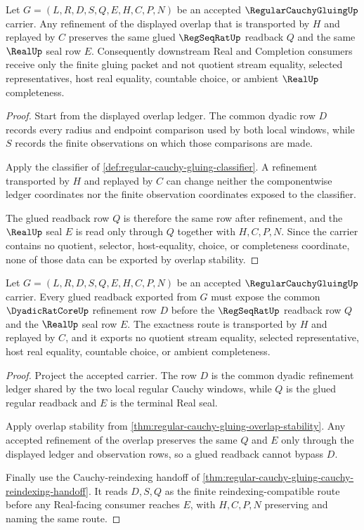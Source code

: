 \begin{theorem}
\label{thm:regular-cauchy-gluing-overlap-stability}
Let $G=(L,R,D,S,Q,E,H,C,P,N)$ be an accepted $\RegularCauchyGluingUp$ carrier. Any refinement of the displayed overlap that is transported by $H$ and replayed by $C$ preserves the same glued $\RegSeqRatUp$ readback $Q$ and the same $\RealUp$ seal row $E$. Consequently downstream Real and Completion consumers receive only the finite gluing packet and not quotient stream equality, selected representatives, host real equality, countable choice, or ambient $\RealUp$ completeness.
\end{theorem}
\begin{proof}
Start from the displayed overlap ledger. The common dyadic row $D$ records every radius and endpoint comparison used by both local windows, while $S$ records the finite observations on which those comparisons are made.

Apply the classifier of \autoref{def:regular-cauchy-gluing-classifier}. A refinement transported by $H$ and replayed by $C$ can change neither the componentwise ledger coordinates nor the finite observation coordinates exposed to the classifier.

The glued readback row $Q$ is therefore the same row after refinement, and the $\RealUp$ seal $E$ is read only through $Q$ together with $H,C,P,N$. Since the carrier contains no quotient, selector, host-equality, choice, or completeness coordinate, none of those data can be exported by overlap stability.
\end{proof}

\begin{theorem}
\label{thm:regular-cauchy-gluing-common-refinement-exactness}
Let $G=(L,R,D,S,Q,E,H,C,P,N)$ be an accepted $\RegularCauchyGluingUp$ carrier. Every glued readback exported from $G$ must expose the common $\DyadicRatCoreUp$ refinement row $D$ before the $\RegSeqRatUp$ readback row $Q$ and the $\RealUp$ seal row $E$. The exactness route is transported by $H$ and replayed by $C$, and it exports no quotient stream equality, selected representative, host real equality, countable choice, or ambient completeness.
\end{theorem}
\begin{proof}
Project the accepted carrier. The row $D$ is the common dyadic refinement ledger shared by the two local regular Cauchy windows, while $Q$ is the glued regular readback and $E$ is the terminal Real seal.

Apply overlap stability from \autoref{thm:regular-cauchy-gluing-overlap-stability}. Any accepted refinement of the overlap preserves the same $Q$ and $E$ only through the displayed ledger and observation rows, so a glued readback cannot bypass $D$.

Finally use the Cauchy-reindexing handoff of \autoref{thm:regular-cauchy-gluing-cauchy-reindexing-handoff}. It reads $D,S,Q$ as the finite reindexing-compatible route before any Real-facing consumer reaches $E$, with $H,C,P,N$ preserving and naming the same route.
\end{proof}

